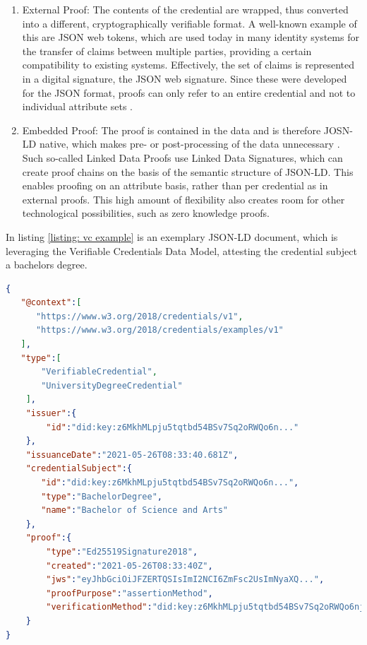         \begin{enumerate}
            \item External Proof: The contents of the credential are wrapped, thus converted into a different, cryptographically verifiable format. A well-known example of this are JSON web tokens, which are used today in many identity systems for the transfer of claims between multiple parties, providing a certain compatibility to existing systems. Effectively, the set of claims is represented in a digital signature, the JSON web signature. Since these were developed for the JSON format, proofs can only refer to an entire credential and not to individual attribute sets \cite{helmy_jwt_2020}. \cite{sporny_verifiable_2019}

            \item Embedded Proof: The proof is contained in the data and is therefore JOSN-LD native, which makes pre- or post-processing of the data unnecessary \cite{sporny_verifiable_2019}. Such so-called Linked Data Proofs use Linked Data Signatures, which can create proof chains on the basis of the semantic structure of JSON-LD.  This enables proofing on an attribute basis, rather than per credential as in external proofs. This high amount of flexibility also creates room for other technological possibilities, such as zero knowledge proofs. \cite{helmy_jwt_2020}
        \end{enumerate}
        
        In listing \ref{listing: vc example} is an exemplary JSON-LD document, which is leveraging the Verifiable Credentials Data Model, attesting the credential subject a bachelors degree.
        \newline
        
        \begin{lstlisting}[language=json, caption={Example of a Bachelors degree as a Verifiable Credential}, captionpos=b, label={listing: vc example}]  
{
   "@context":[
      "https://www.w3.org/2018/credentials/v1",
      "https://www.w3.org/2018/credentials/examples/v1"
   ],
   "type":[
       "VerifiableCredential",
       "UniversityDegreeCredential"
    ],
    "issuer":{
        "id":"did:key:z6MkhMLpju5tqtbd54BSv7Sq2oRWQo6n..."
    },
    "issuanceDate":"2021-05-26T08:33:40.681Z",
    "credentialSubject":{
       "id":"did:key:z6MkhMLpju5tqtbd54BSv7Sq2oRWQo6n...",
       "type":"BachelorDegree",
       "name":"Bachelor of Science and Arts"
    },
    "proof":{
        "type":"Ed25519Signature2018",
        "created":"2021-05-26T08:33:40Z",
        "jws":"eyJhbGciOiJFZERTQSIsImI2NCI6ZmFsc2UsImNyaXQ...",
        "proofPurpose":"assertionMethod",
        "verificationMethod":"did:key:z6MkhMLpju5tqtbd54BSv7Sq2oRWQo6njMEywrbWAGAp3442#z6MkhM..."
    }
}\end{lstlisting}
	   
